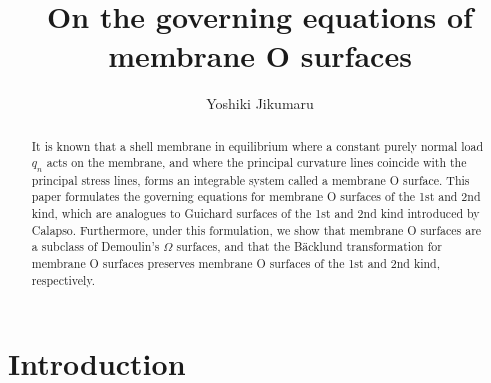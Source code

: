 \documentclass[a4paper]{amsart}
\title{On the governing equations of membrane O surfaces}
\author{Yoshiki Jikumaru}
\theoremstyle{definition}
\begin{document}
\maketitle

\begin{abstract}
It is known that a shell membrane in equilibrium where a constant purely normal load $q_n$ acts on the membrane, and where the principal curvature lines coincide with the principal stress lines, forms an integrable system called a membrane O surface.
This paper formulates the governing equations for membrane O surfaces of the 1st and 2nd kind, which are analogues to Guichard surfaces of the 1st and 2nd kind introduced by Calapso.
Furthermore, under this formulation, we show that membrane O surfaces are a subclass of Demoulin's $\Omega$ surfaces, and that the B\"acklund transformation for membrane O surfaces preserves membrane O surfaces of the 1st and 2nd kind, respectively.
\end{abstract}

\section{Introduction}
\end{document}
